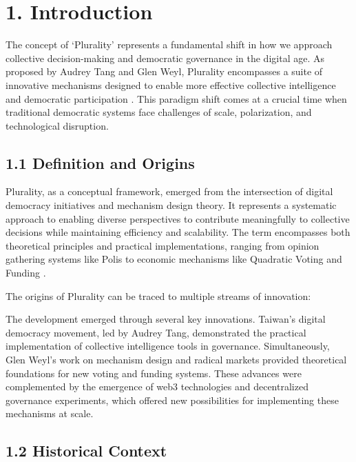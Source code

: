 \hypertarget{introduction}{%
\section{1. Introduction}\label{introduction}}

The concept of `Plurality' represents a fundamental shift in how we approach collective decision-making and democratic governance in the digital age. As proposed by Audrey Tang and Glen Weyl, Plurality encompasses a suite of innovative mechanisms designed to enable more effective collective intelligence and democratic participation \citep{weyl2022decentralized}. This paradigm shift comes at a crucial time when traditional democratic systems face challenges of scale, polarization, and technological disruption.

\hypertarget{definition-and-origins}{%
\subsection{1.1 Definition and Origins}\label{definition-and-origins}}

Plurality, as a conceptual framework, emerged from the intersection of digital democracy initiatives and mechanism design theory. It represents a systematic approach to enabling diverse perspectives to contribute meaningfully to collective decisions while maintaining efficiency and scalability. The term encompasses both theoretical principles and practical implementations, ranging from opinion gathering systems like Polis to economic mechanisms like Quadratic Voting and Funding \citep{buterin2019flexible}.

The origins of Plurality can be traced to multiple streams of innovation:

The development emerged through several key innovations. Taiwan's digital democracy movement, led by Audrey Tang, demonstrated the practical implementation of collective intelligence tools in governance. Simultaneously, Glen Weyl's work on mechanism design and radical markets provided theoretical foundations for new voting and funding systems. These advances were complemented by the emergence of web3 technologies and decentralized governance experiments, which offered new possibilities for implementing these mechanisms at scale.

\hypertarget{historical-context}{%
\subsection{1.2 Historical Context}\label{historical-context}}

